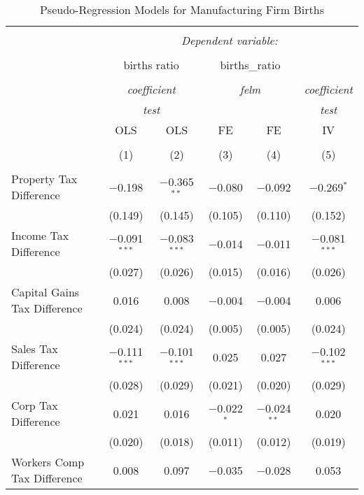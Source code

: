 
\begin{table}[!htbp] \centering 
  \caption{Pseudo-Regression Models for  Manufacturing Firm Births} 
  \label{} 
\begin{tabular}{@{\extracolsep{5pt}}lccccc} 
\\[-1.8ex]\hline 
\hline \\[-1.8ex] 
 & \multicolumn{5}{c}{\textit{Dependent variable:}} \\ 
\cline{2-6} 
\\[-1.8ex] & \multicolumn{2}{c}{births ratio} & \multicolumn{2}{c}{births\_ratio} &   \\ 
\\[-1.8ex] & \multicolumn{2}{c}{\textit{coefficient}} & \multicolumn{2}{c}{\textit{felm}} & \textit{coefficient} \\ 
 & \multicolumn{2}{c}{\textit{test}} & \multicolumn{2}{c}{\textit{}} & \textit{test} \\ 
 & OLS & OLS & FE & FE & IV \\ 
\\[-1.8ex] & (1) & (2) & (3) & (4) & (5)\\ 
\hline \\[-1.8ex] 
 Property Tax Difference & $-$0.198 & $-$0.365$^{**}$ & $-$0.080 & $-$0.092 & $-$0.269$^{*}$ \\ 
  & (0.149) & (0.145) & (0.105) & (0.110) & (0.152) \\ 
  Income Tax Difference & $-$0.091$^{***}$ & $-$0.083$^{***}$ & $-$0.014 & $-$0.011 & $-$0.081$^{***}$ \\ 
  & (0.027) & (0.026) & (0.015) & (0.016) & (0.026) \\ 
  Capital Gains Tax Difference & 0.016 & 0.008 & $-$0.004 & $-$0.004 & 0.006 \\ 
  & (0.024) & (0.024) & (0.005) & (0.005) & (0.024) \\ 
  Sales Tax Difference & $-$0.111$^{***}$ & $-$0.101$^{***}$ & 0.025 & 0.027 & $-$0.102$^{***}$ \\ 
  & (0.028) & (0.029) & (0.021) & (0.020) & (0.029) \\ 
  Corp Tax Difference & 0.021 & 0.016 & $-$0.022$^{*}$ & $-$0.024$^{**}$ & 0.020 \\ 
  & (0.020) & (0.018) & (0.011) & (0.012) & (0.019) \\ 
  Workers Comp Tax Difference & 0.008 & 0.097 & $-$0.035 & $-$0.028 & 0.053 \\ 

\end{tabular}
\end{table}

